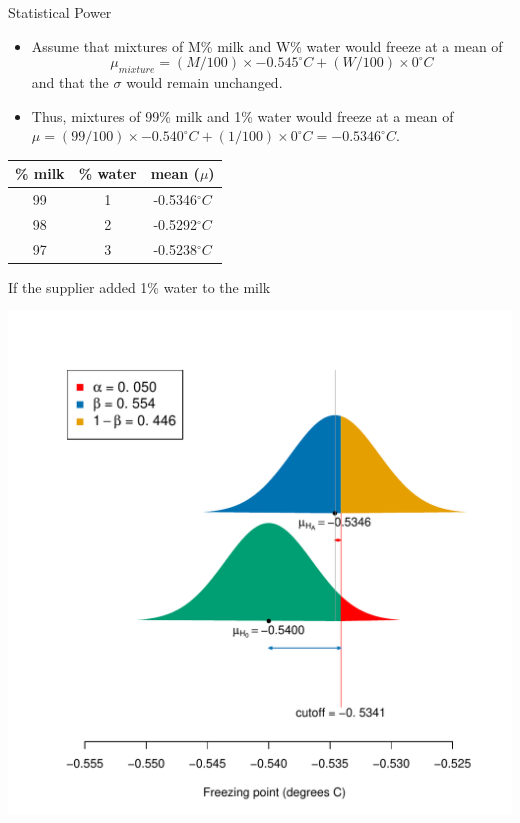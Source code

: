 \documentclass[10pt,handout]{beamer}\usepackage[]{graphicx}\usepackage[]{color}
\makeatletter
\def\maxwidth{ %
  \ifdim\Gin@nat@width>\linewidth
    \linewidth
  \else
    \Gin@nat@width
  \fi
}
\newenvironment{knitrout}{}{} %
\makeatother
\begin{document}
\begin{frame}{Statistical Power}
	\small
	\begin{itemize}
		\setlength\itemsep{1em}
		\item Assume that  mixtures of M\% milk and W\% water  would freeze at a mean of $$\mu_{mixture} =  (M/100) \times -0.545^{\circ}C + (W/100) \times 0 ^{\circ}C$$ and that the $\sigma$ would remain unchanged. \pause 
		\item Thus, mixtures of 99\% milk and 1\% water  would freeze at a mean of $\mu =  (99/100) \times -0.540^{\circ}C + (1/100) \times 0 ^{\circ}C = -0.5346 ^{\circ} C.$ 
	\end{itemize}
	
	\begin{center}
		\begin{tabular}{|c|c|c|}
			\hline 
			\% milk & \% water & mean ($\mu$) \\ 
			\hline 
			99 & 1 & -0.5346$^{\circ}C$ \\ 
			98 & 2 & -0.5292$^{\circ}C$ \\ 
			97 & 3 & -0.5238$^{\circ}C$ \\ 
			\hline 
		\end{tabular} 
	\end{center}
\end{frame}


\begin{frame}[fragile]{If the supplier added 1\% water to the milk}
\begin{knitrout}\tiny
{}\color{fgcolor}

{\centering \includegraphics[width=\maxwidth]{figure/unnamed-chunk-8-1} 

}


\end{knitrout}
\end{frame}
\end{document}
